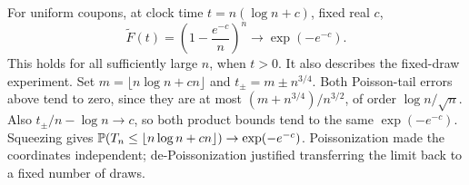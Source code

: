 \begin{example}
For uniform coupons, at clock time $t=n(\log n+c)$, fixed real $c$,
\[
\widetilde F(t)=\left(1-\frac{e^{-c}}n\right)^n
\longrightarrow \exp(-e^{-c}).
\]
This holds for all sufficiently large $n$, when $t>0$.
It also describes the fixed-draw experiment. Set
$m=\lfloor n\log n+cn\rfloor$ and $t_\pm=m\pm n^{3/4}$.
Both Poisson-tail errors above tend to zero, since they are at most
$(m+n^{3/4})/n^{3/2}$, of order $\log n/\sqrt n$.
Also $t_\pm/n-\log n\to c$, so both product bounds tend to the same
$\exp(-e^{-c})$. Squeezing gives
$\P(T_n\le\lfloor n\log n+cn\rfloor)\to\exp(-e^{-c})$.
Poissonization made the coordinates independent; de-Poissonization
justified transferring the limit back to a fixed number of draws.
\end{example}
